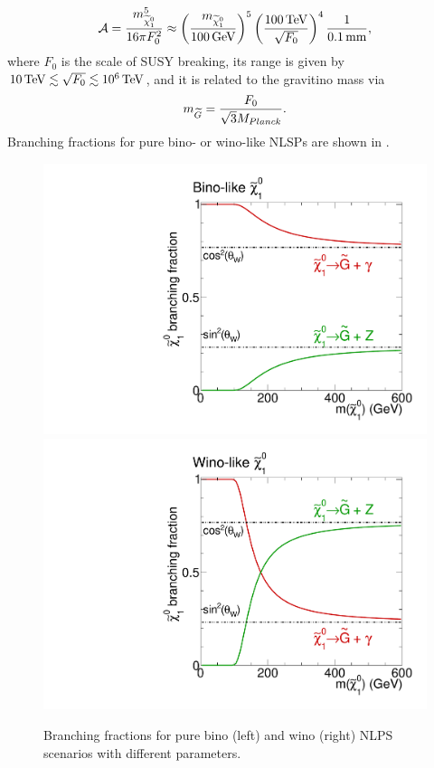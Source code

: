 \begin{equation}
 \mathcal{A} = \frac{m_{\widetilde{\chi}^{0}_{1}}^5}{16\pi F_{0}^{2}}\approx\left(\frac{m_{\widetilde{\chi}^{0}_{1}}}{100\,\text{Ge\hspace{-.08em}V}}\right)^5\left(\frac{100\,\text{Te\hspace{-.08em}V}}{\sqrt{F_0}}\right)^4 \frac{1}{0.1\,\text{mm}},
\end{equation}
where $F_0$ is the scale of SUSY breaking, its range is given by $10\,\text{Te\hspace{-.08em}V}\lesssim\sqrt{F_0}\lesssim10^6\,\text{Te\hspace{-.08em}V}$, and it is related to the gravitino mass via
\begin{equation}
 m_{\widetilde{G}}=\frac{F_0}{\sqrt{3}M_{Planck}}.
\end{equation}
Branching fractions for pure bino- or wino-like NLSPs are shown in .
\begin{figure}[htb]
 \centering
 \includegraphics[width=\pairwidth]{figures/signal/binoBranching}
 \includegraphics[width=\pairwidth]{figures/signal/winoBranching}%
 \caption{Branching fractions for pure bino (left) and wino (right) NLPS scenarios with different parameters.}
 \label{fig:BRNLSP}
\end{figure}
